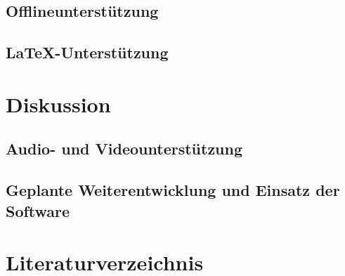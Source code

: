 \documentclass[ngerman]{article}
\begin{document}
\subsection{Offlineunterst\"utzung}
\subsection{\LaTeX-Unterst\"utzung}
\section{Diskussion}
\subsection{Audio- und Videounterst\"utzung}
\subsection{Geplante Weiterentwicklung und Einsatz der Software}
\newpage
\section{Literaturverzeichnis}
\printbibliography
\end{document}

